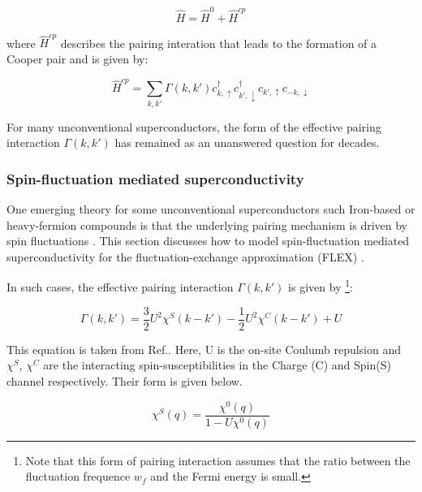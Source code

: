 \documentclass[12pt]{article}
\begin{document}
\begin{equation}\label{General Hamiltonian}
    \hat{H} = \hat{H}^0 + \hat{H}^{cp}
\end{equation}

\noindent where $\hat{H}^{cp}$ describes the pairing interation that leads to the formation of a Cooper pair and is given by:

\begin{equation}\label{Hcp}
    \hat{H}^{cp} = \sum_{k,k'} \Gamma(k, k') c^{\dagger}_{k, \uparrow}  c^{\dagger}_{k', \downarrow} c_{k', \uparrow}c_{-k, \downarrow}
\end{equation}

\noindent For many unconventional superconductors, the form of the effective pairing interaction $\Gamma(k,k')$ has remained as an unanswered question for decades.

\subsubsection{Spin-fluctuation mediated superconductivity}

One emerging theory for some unconventional superconductors such Iron-based or heavy-fermion compounds 
is that the underlying pairing mechanism is driven by spin fluctuations \cite{moriya2000spin}. This section discusses how to
model spin-fluctuation mediated superconductivity for the fluctuation-exchange approximation (FLEX) \cite{esirgen1997fluctuation}. \par
\medskip
\noindent In such cases, the effective pairing interaction $\Gamma(k,k')$ is given by \footnote{Note that this form of pairing interaction 
assumes that the ratio between 
the fluctuation frequence $w_f$ and the Fermi energy is small.}:

\begin{equation}\label{Pairing interaction SF}
    \Gamma(k,k') = \frac{3}{2} U^2 \chi^S(k-k') -\frac{1}{2}U^2 \chi^C(k-k') + U
\end{equation} 

\noindent This equation is taken from Ref.\cite{migdal1958interaction}. Here, U is the on-site Coulumb repulsion and $\chi^S$, $\chi^C$ are the interacting spin-susceptibilities in the Charge (C) and Spin(S) channel respectively. Their form is given below.

\begin{equation}
    \chi^S(q) = \frac{\chi^0(q)}{1 - U \chi^0 (q)}
\end{equation}
\end{document}
